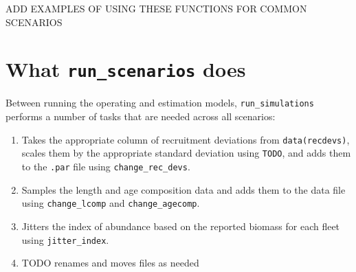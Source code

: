 \documentclass[12pt]{article}
\begin{document}
ADD EXAMPLES OF USING THESE FUNCTIONS FOR COMMON SCENARIOS

\section*{What \texttt{run\_scenarios} does}

Between running the operating and estimation models, \texttt{run\_simulations}
performs a number of tasks that are needed across all scenarios:

\begin{enumerate}
  \item Takes the appropriate column of recruitment deviations from
    \texttt{data(recdevs)}, scales them by the appropriate standard deviation
    using \texttt{TODO}, and adds them to the \texttt{.par} file using
    \texttt{change\_rec\_devs}.
  \item Samples the length and age composition data and adds them to the data
    file using \texttt{change\_lcomp} and \texttt{change\_agecomp}.
  \item Jitters the index of abundance based on the reported biomass for each
    fleet using \texttt{jitter\_index}.
  \item TODO renames and moves files as needed
\end{enumerate}







%
\end{document}
